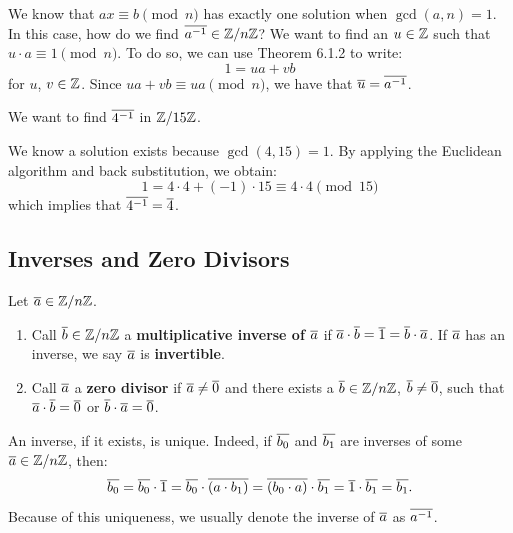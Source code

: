 We know that $ax \equiv b \pmod{n}$ has exactly one solution when $\gcd(a,n) = 1$. In this case, how do we find $\overline{a^{-1}} \in \mathbb{Z}/n\mathbb{Z}$? We want to find an $u \in \mathbb{Z}$ such that $u \cdot a \equiv 1 \pmod{n}$. To do so, we can use Theorem 6.1.2 to write:
\[ 1 = ua + vb \]
for $u$, $v \in \mathbb{Z}$. Since $ua + vb \equiv ua \pmod{n}$, we have that $\overline{u} = \overline{a^{-1}}$. 

\begin{example}
   We want to find $\overline{4^{-1}}$ in $\mathbb{Z}/15\mathbb{Z}$.
\end{example}
\begin{solution}
   We know a solution exists because $\gcd(4, 15) = 1$. By applying the Euclidean algorithm and back substitution, we obtain:
   \[ 1 = 4 \cdot 4 + (-1) \cdot 15 \equiv 4 \cdot 4 \pmod{15} \]
   which implies that $\overline{4^{-1}} = \overline{4}$. 
\end{solution}

\subsection{Inverses and Zero Divisors}

\begin{defbox}
   Let $\overline{a} \in \mathbb{Z}/n\mathbb{Z}$.
   \begin{enumerate}
      \item Call $\overline{b} \in \mathbb{Z}/n\mathbb{Z}$ a \textbf{multiplicative inverse of $\overline{a}$} if $\overline{a} \cdot \overline{b} = \overline{1} = \overline{b} \cdot \overline{a}$. If $\overline{a}$ has an inverse, we say $\overline{a}$ is \textbf{invertible}. 
      \item Call $\overline{a}$ a \textbf{zero divisor} if $\overline{a} \neq \overline{0}$ and there exists a $\overline{b} \in \mathbb{Z}/n\mathbb{Z}$, $\overline{b} \neq \overline{0}$, such that $\overline{a} \cdot \overline{b} = \overline{0}$ or $\overline{b} \cdot \overline{a} = \overline{0}$. 
   \end{enumerate}
\end{defbox}
\begin{remark}
   An inverse, if it exists, is unique. Indeed, if $\overline{b_0}$ and $\overline{b_1}$ are inverses of some $\overline{a} \in \mathbb{Z}/n\mathbb{Z}$, then:
   \[ \overline{b_0} = \overline{b_0} \cdot \overline{1} = \overline{b_0} \cdot \overline{(a \cdot b_1)} = \overline{(b_0 \cdot a)} \cdot \overline{b_1} = \overline{1} \cdot \overline{b_1} = \overline{b_1}. \]
   Because of this uniqueness, we usually denote the inverse of $\overline{a}$ as $\overline{a^{-1}}$. 
\end{remark}

